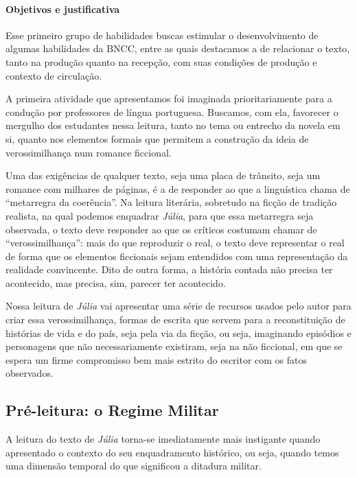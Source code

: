\documentclass[12pt]{extarticle}
\begin{document}
\paragraph{Objetivos e justificativa}

Esse primeiro grupo de habilidades buscas estimular o desenvolvimento de algumas habilidades da BNCC, entre as quais destacamos a de relacionar o texto, tanto na produção quanto na recepção, com suas condições de produção e contexto de circulação. 


A primeira atividade que apresentamos foi imaginada prioritariamente
para a condução por professores de língua portuguesa. Buscamos, com ela,
favorecer o mergulho dos estudantes nessa leitura, tanto no tema ou
entrecho da novela em si, quanto nos elementos formais que permitem a
construção da ideia de verossimilhança num romance ficcional.

Uma das exigências de qualquer texto, seja uma placa de trânsito, seja
um romance com milhares de páginas, é a de responder ao que a
linguística chama de ``metarregra da coerência''. Na leitura literária,
sobretudo na ficção de tradição realista, na qual podemos enquadrar
\emph{Júlia}, para que essa metarregra seja observada, o texto deve
responder ao que os críticos costumam chamar de ``verossimilhança'':
mais do que reproduzir o real, o texto deve representar o real de forma
que os elementos ficcionais sejam entendidos com uma representação da
realidade convincente. Dito de outra forma, a história contada não
precisa ter acontecido, mas precisa, sim, parecer ter acontecido.

Nossa leitura de \emph{Júlia} vai apresentar uma série de recursos
usados pelo autor para criar essa verossimilhança, formas de escrita que
servem para a reconstituição de histórias de vida e do país, seja pela
via da ficção, ou seja, imaginando episódios e personagens que não
necessariamente existiram, seja na não ficcional, em que se espera um
firme compromisso bem mais estrito do escritor com os fatos observados.

\subsection{Pré-leitura: o Regime Militar}

A leitura do texto de \emph{Júlia} torna-se imediatamente mais
instigante quando apresentado o contexto do seu enquadramento histórico,
ou seja, quando temos uma dimensão temporal do que significou a ditadura
militar.
\end{document}

